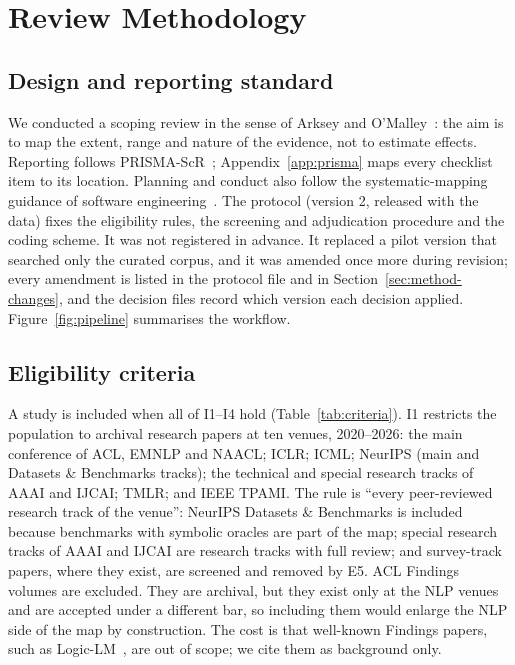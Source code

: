 \section{Review Methodology}
\label{sec:method}

\subsection{Design and reporting standard}
We conducted a scoping review in the sense of Arksey and O'Malley~\cite{arksey2005scoping}: the aim is to map the extent, range and nature of the evidence, not to estimate effects. Reporting follows PRISMA-ScR~\cite{tricco2018prisma}; Appendix~\ref{app:prisma} maps every checklist item to its location. Planning and conduct also follow the systematic-mapping guidance of software engineering~\cite{petersen2008systematic,kitchenham2007guidelines}. The protocol (version 2, released with the data) fixes the eligibility rules, the screening and adjudication procedure and the coding scheme. It was not registered in advance. It replaced a pilot version that searched only the curated corpus, and it was amended once more during revision; every amendment is listed in the protocol file and in Section~\ref{sec:method-changes}, and the decision files record which version each decision applied. Figure~\ref{fig:pipeline} summarises the workflow.



\subsection{Eligibility criteria}
\label{sec:method-eligibility}
A study is included when all of I1--I4 hold (Table~\ref{tab:criteria}). I1 restricts the population to archival research papers at ten venues, 2020--2026: the main conference of ACL, EMNLP and NAACL; ICLR; ICML; NeurIPS (main and Datasets \& Benchmarks tracks); the technical and special research tracks of AAAI and IJCAI; TMLR; and IEEE TPAMI. The rule is ``every peer-reviewed research track of the venue'': NeurIPS Datasets \& Benchmarks is included because benchmarks with symbolic oracles are part of the map; special research tracks of AAAI and IJCAI are research tracks with full review; and survey-track papers, where they exist, are screened and removed by E5. ACL Findings volumes are excluded. They are archival, but they exist only at the NLP venues and are accepted under a different bar, so including them would enlarge the NLP side of the map by construction. The cost is that well-known Findings papers, such as Logic-LM~\cite{pan2023logiclm}, are out of scope; we cite them as background only.


